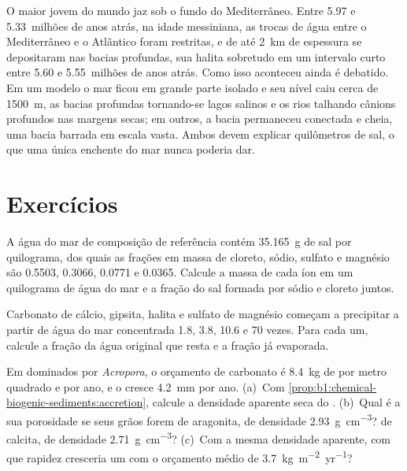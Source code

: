 O maior  jovem do mundo jaz sob o fundo do Mediterrâneo. Entre 5.97 e 5.33~milhões
de anos atrás, na idade messiniana, as trocas de água entre o Mediterrâneo e o Atlântico
foram restritas, e  de até \qty{2}{km} de espessura se depositaram nas bacias
profundas, sua halita sobretudo em um intervalo curto entre 5.60 e 5.55~milhões de anos
atrás. Como isso aconteceu ainda é debatido. Em um modelo o mar ficou em grande parte
isolado e seu nível caiu cerca de \qty{1500}{m}, as bacias profundas tornando-se lagos
salinos e os rios talhando cânions profundos nas margens secas; em outros, a bacia
permaneceu conectada e cheia, uma bacia barrada em escala vasta. Ambos devem explicar
quilômetros de sal, o que uma única enchente do mar nunca poderia dar.

\section{Exercícios}

\begin{exercise}[$\star$]\label{exo:b1:chemical-biogenic-sediments:1}
A água do mar de composição de referência contém \qty{35.165}{g} de sal por quilograma,
dos quais as frações em massa de cloreto, sódio, sulfato e magnésio são 0.5503, 0.3066,
0.0771 e 0.0365. Calcule a massa de cada íon em um quilograma de água do mar e a fração do
sal formada por sódio e cloreto juntos.
\end{exercise}

\begin{exercise}[$\star$]\label{exo:b1:chemical-biogenic-sediments:2}
Carbonato de cálcio, gipsita, halita e sulfato de magnésio começam a precipitar a partir de
água do mar concentrada 1.8, 3.8, 10.6 e 70 vezes. Para cada um, calcule a fração da água
original que resta e a fração já evaporada.
\end{exercise}

\begin{exercise}[$\star$]\label{exo:b1:chemical-biogenic-sediments:3}
Em  dominados por \emph{Acropora}, o orçamento de carbonato é \qty{8.4}{kg} de
 por metro quadrado e por ano, e o  cresce \qty{4.2}{mm} por ano. (a)~Com
\cref{prop:b1:chemical-biogenic-sediments:accretion}, calcule a densidade aparente seca do
. (b)~Qual é a sua porosidade se seus grãos forem de aragonita, de densidade
\qty{2.93}{g.cm^{-3}}? de calcita, de densidade \qty{2.71}{g.cm^{-3}}? (c)~Com a mesma
densidade aparente, com que rapidez cresceria um  com o orçamento médio de
\qty{3.7}{kg.m^{-2}.yr^{-1}}?
\end{exercise}

